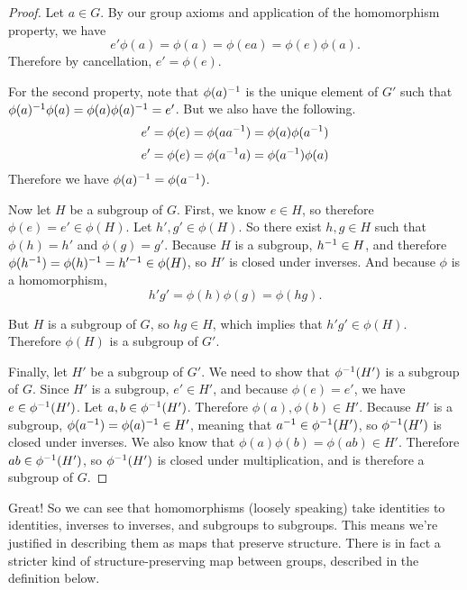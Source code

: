 \begin{proof}
Let $a \in G$. By our group axioms and application of the homomorphism property, we have
\begin{equation*}
    e'\phi(a) = \phi(a) = \phi(ea) = \phi(e)\phi(a).
\end{equation*}
Therefore by cancellation, $e' = \phi(e)$.

For the second property, note that $\phi(a)^{-1}$ is the unique element of $G'$ such that $\phi(a)^{-1}\phi(a) = \phi(a)\phi(a)^{-1} = e'$. But we also have the following.
\begin{equation*}
    e' = \phi(e) = \phi(aa^{-1}) = \phi(a)\phi(a^{-1})
\end{equation*}
\begin{equation*}
    e' = \phi(e) = \phi(a^{-1} a) = \phi(a^{-1})\phi(a)
\end{equation*}
Therefore we have $\phi(a)^{-1} = \phi(a^{-1})$.

Now let $H$ be a subgroup of $G$. First, we know $e \in H$, so therefore $\phi(e) = e' \in \phi(H)$. Let $h', g' \in \phi(H)$. So there exist $h, g \in H$ such that $\phi(h) = h'$ and $\phi(g) = g'$. Because $H$ is a subgroup, $h^{-1} \in H$, and therefore $\phi(h^{-1}) = \phi(h)^{-1} = h'^{-1} \in \phi(H)$, so $H'$ is closed under inverses. And because $\phi$ is a homomorphism,
\begin{equation*}
    h'g' = \phi(h)\phi(g) = \phi(hg).
\end{equation*}

But $H$ is a subgroup of $G$, so $hg \in H$, which implies that $h'g' \in \phi(H)$. Therefore $\phi(H)$ is a subgroup of $G'$.

Finally, let $H'$ be a subgroup of $G'$. We need to show that $\phi^{-1} (H')$ is a subgroup of $G$. Since $H'$ is a subgroup, $e' \in H'$, and because $\phi(e) = e'$, we have $e \in \phi^{-1}(H')$. Let $a, b \in \phi^{-1}(H')$. Therefore $\phi(a), \phi(b) \in H'$. Because $H'$ is a subgroup, $\phi(a^{-1}) = \phi(a)^{-1} \in H'$, meaning that $a^{-1} \in \phi^{-1}(H')$, so $\phi^{-1}(H')$ is closed under inverses. We also know that $\phi(a)\phi(b) = \phi(ab) \in H'$. Therefore $ab \in \phi^{-1}(H')$, so $\phi^{-1}(H')$ is closed under multiplication, and is therefore a subgroup of $G$.

\end{proof}

Great! So we can see that homomorphisms (loosely speaking) take identities to identities, inverses to inverses, and subgroups to subgroups. This means we're justified in describing them as maps that preserve structure. There is in fact a stricter kind of structure-preserving map between groups, described in the definition below.

